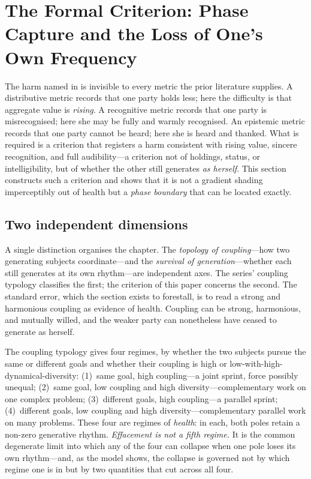 \section{The Formal Criterion: Phase Capture and the Loss of One's Own Frequency}
\label{p18:sec:criterion}

\noindent
The harm named in  is invisible to every metric the prior literature supplies. A distributive metric records that one party holds less; here the difficulty is that aggregate value is \emph{rising}. A recognitive metric records that one party is misrecognised; here she may be fully and warmly recognised. An epistemic metric records that one party cannot be heard; here she is heard and thanked. What is required is a criterion that registers a harm consistent with rising value, sincere recognition, and full audibility---a criterion not of holdings, status, or intelligibility, but of whether the other still generates \emph{as herself}. This section constructs such a criterion and shows that it is not a gradient shading imperceptibly out of health but a \emph{phase boundary} that can be located exactly.

\subsection{Two independent dimensions}
\label{p18:sub:crit-two}

A single distinction organises the chapter. The \emph{topology of coupling}---how two generating subjects coordinate---and the \emph{survival of generation}---whether each still generates at its own rhythm---are independent axes. The series' coupling typology classifies the first; the criterion of this paper concerns the second. The standard error, which the section exists to forestall, is to read a strong and harmonious coupling as evidence of health. Coupling can be strong, harmonious, and mutually willed, and the weaker party can nonetheless have ceased to generate as herself.

The coupling typology gives four regimes, by whether the two subjects pursue the same or different goals and whether their coupling is high or low-with-high-dynamical-diversity: (1)~same goal, high coupling---a joint sprint, force possibly unequal; (2)~same goal, low coupling and high diversity---complementary work on one complex problem; (3)~different goals, high coupling---a parallel sprint; (4)~different goals, low coupling and high diversity---complementary parallel work on many problems. These four are regimes of \emph{health}: in each, both poles retain a non-zero generative rhythm. \emph{Effacement is not a fifth regime.} It is the common degenerate limit into which any of the four can collapse when one pole loses its own rhythm---and, as the model shows, the collapse is governed not by which regime one is in but by two quantities that cut across all four.


